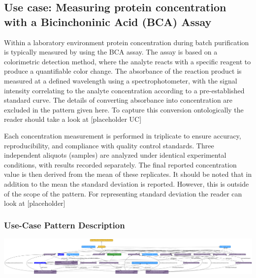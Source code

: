 \subsection{Use case: Measuring protein concentration with a  Bicinchoninic Acid (BCA) Assay}
Within a laboratory environment protein concentration during batch purification is typically measured by using the BCA assay. The assay is based on a colorimetric detection method, where the analyte reacts with a specific reagent to produce a quantifiable color change. The absorbance of the reaction product is measured at a defined wavelength using a spectrophotometer, with the signal intensity correlating to the analyte concentration according to a pre-established standard curve.  The details of converting absorbance into concentration are excluded in the pattern given here. To capture this conversion ontologically the reader should take a look at [placeholder UC] 

Each concentration measurement is performed in triplicate to ensure accuracy, reproducibility, and compliance with quality control standards. Three independent aliquots (samples) are analyzed under identical experimental conditions, with results recorded separately. The final reported concentration value is then derived from the mean of these replicates. It should be noted that in addition to the mean the standard deviation is reported. However, this is outside of the scope of the pattern. For representing standard deviation the reader can look at [placeholder]

\subsubsection*{Use-Case Pattern Description}

\includegraphics[scale=0.15]{scenarios/measurements/image/measurement_aggregate_usecase1.png}
